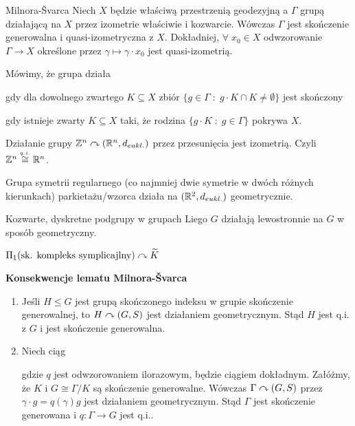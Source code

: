 \begin{lemma}{Milnora-\v{S}varca}{}
  Niech $X$ będzie właściwą przestrzenią geodezyjną a $\Gamma$ grupą działającą na $X$ przez izometrie właściwie i kozwarcie. Wówczas $\Gamma$ jest skończenie generowalna i quasi-izometryczna z $X$. Dokładniej, $\forall\;x_0\in X$ odwzorowanie $\Gamma\to X$ określone przez $\gamma\mapsto \gamma\cdot x_0$ jest quasi-izometrią.
\end{lemma}

Mówimy, że grupa działa
\begin{description}[format=\color{orange}]
  \item[właściwie,] gdy dla dowolnego zwartego $K\subseteq X$ zbiór $\{g\in\Gamma\;:\;g\cdot K\cap K\neq \emptyset\}$ jest skończony
  \item[kozwarcie,] gdy istnieje zwarty $K\subseteq X$ taki, że rodzina $\{g\cdot K\;:\;g\in\Gamma\}$ pokrywa $X$.
\end{description}

\begin{example}[m]
\item Działanie grupy $\mathbb{Z}^n\curvearrowright(\mathbb{R}^n, d_{eukl.})$ przez przesunięcia jest izometrią. Czyli $\mathbb{Z}^n\overset{{\scriptscriptstyle q.i.}}{\cong}\mathbb{R}^n$.
\item Grupa symetrii regularnego (co najmniej dwie symetrie w dwóch różnych kierunkach) parkietażu/wzorca działa na $(\mathbb{R}^2, d_{eukl.})$ geometrycznie.
\item Kozwarte, dyskretne podgrupy w grupach Liego $G$ działają lewostronnie na $G$ w sposób geometryczny.
\item $\Pi_1(\text{sk. kompleks symplicajlny})\curvearrowright\widetilde{K}$
\end{example}

\textbf{\color{green}Konsekwencje lematu Milnora-\v{S}varca}
\begin{enumerate}
  \item Jeśli $H\leq G$ jest grupą skończonego indeksu w grupie skończenie generowalnej, to $H\curvearrowright (G, S)$ jest działaniem geometrycznym. Stąd $H$ jest q.i. z $G$ i jest skończenie generowalna.
  \item Niech ciąg
    \begin{center}\end{center} 
    gdzie $q$ jest odwzorowaniem ilorazowym, będzie ciągiem dokładnym. Załóżmy, że $K$ i $G\cong \Gamma/K$ są skończenie generowalne. Wówczas $\Gamma\curvearrowright (G, S)$ przez $\gamma\cdot g=q(\gamma)g$ jest działaniem geometrycznym. Stąd $\Gamma$ jest skończenie generowana i $q:\Gamma\to G$ jest q.i..
\end{enumerate}


